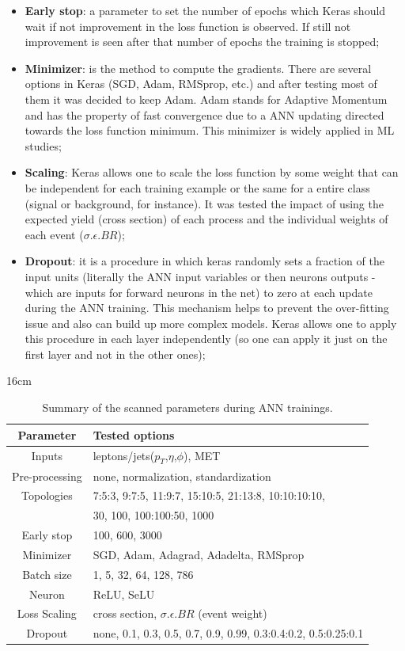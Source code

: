 \begin{itemize}
	\item \textbf{Early stop}: a parameter to set the number of epochs which Keras should wait if not improvement in the loss function is observed. If still not improvement is seen after that number of epochs the training is stopped;
	\item \textbf{Minimizer}: is the method to compute the gradients. There are several options in Keras (SGD, Adam, RMSprop, etc.) and after testing most of them it was decided to keep Adam. Adam stands for Adaptive Momentum and has the property of fast convergence due to a ANN updating directed towards the loss function minimum. This minimizer is widely applied in ML studies;
	\item \textbf{Scaling}: Keras allows one to scale the loss function by some weight that can be independent for each training example or the same for a entire class (signal or background, for instance). It was tested the impact of using the expected yield (cross section) of each process and the individual weights of each event ($\sigma.\epsilon.BR$);
	\item \textbf{Dropout}: it is a procedure in which keras randomly sets a fraction of the input units (literally the ANN input variables or then neurons outputs - which are inputs for forward neurons in the net) to zero at each update during the ANN training. This mechanism helps to prevent the over-fitting issue and also can build up more complex models. Keras allows one to apply this procedure in each layer independently (so one can apply it just on the first layer and not in the other ones);
\end{itemize}

\begin{table}[hbtp]{16cm}
	\centering
	\caption{Summary of the scanned parameters during ANN trainings.}
	\begin{tabular}{c|l}
		\hline
		\rowcolor{light_gray}
		Parameter      & Tested options\\
		\hline
		Inputs         & leptons/jets($p_{T}$,$\eta$,$\phi$), MET\\
		\hline
		Pre-processing & none, normalization, standardization\\
		\hline
		Topologies     & 7:5:3, 9:7:5, 11:9:7, 15:10:5, 21:13:8, 10:10:10:10,\\
		               & 30, 100, 100:100:50, 1000\\
		\hline
		Early stop     & 100, 600, 3000\\
		\hline
		Minimizer      & SGD, Adam, Adagrad, Adadelta, RMSprop\\
		\hline
		Batch size     & 1, 5, 32, 64, 128, 786\\
		\hline
		Neuron         & ReLU, SeLU\\
		\hline
		Loss Scaling   & cross section, $\sigma.\epsilon.BR$ (event weight)\\
		\hline
		Dropout        & none, 0.1, 0.3, 0.5, 0.7, 0.9, 0.99, 0.3:0.4:0.2, 0.5:0.25:0.1\\
		\hline
	\end{tabular}
	\label{tab:training_parameters_summary}	
\end{table}

